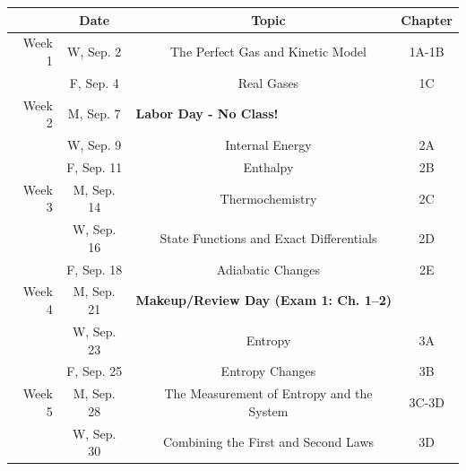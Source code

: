 \documentclass[12pt, letterpaper]{article}
\begin{document}
\begin{tabular}{rcccc}
	       & Date       &                                                                   & Topic                                      & Chapter \\
	\midrule
	Week 1 & W, Sep. 2  &                                                                   & The Perfect Gas and Kinetic Model          & 1A-1B   \\
	       & F, Sep. 4  &                                                                   & Real Gases                                 & 1C      \\
	\midrule
	Week 2 & M, Sep. 7  & \multicolumn{3}{l}{\textbf{Labor Day - No Class!}}                                                                       \\
	       & W, Sep. 9  &                                                                   & Internal Energy                            & 2A      \\
	       & F, Sep. 11 &                                                                   & Enthalpy                                   & 2B      \\
	\midrule
	Week 3 & M, Sep. 14 &                                                                   & Thermochemistry                            & 2C      \\
	       & W, Sep. 16 &                                                                   & State Functions and Exact Differentials    & 2D      \\
	       & F, Sep. 18 &                                                                   & Adiabatic Changes                          & 2E      \\
	\midrule
	Week 4 & M, Sep. 21 & \multicolumn{3}{l}{\textbf{Makeup/Review Day (Exam 1: Ch. 1--2)}}                                                        \\
	       & W, Sep. 23 &                                                                   & Entropy                                    & 3A      \\
	       & F, Sep. 25 &                                                                   & Entropy Changes                            & 3B      \\
	\midrule
	Week 5 & M, Sep. 28 &                                                                   & The Measurement of Entropy and the System  & 3C-3D   \\
	       & W, Sep. 30 &                                                                   & Combining the First and Second Laws        & 3D      \\

\end{tabular}
\end{document}
